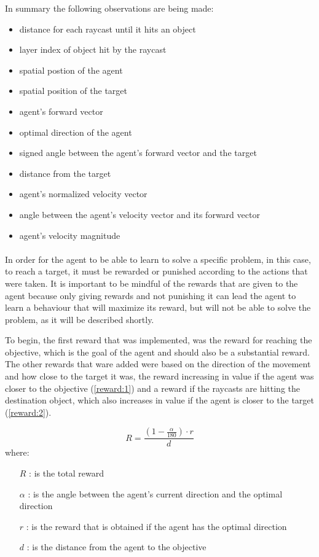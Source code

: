 In summary the following observations are being made:
\begin{itemize}
    \item distance for each raycast until it hits an object
    \item layer index of object hit by the raycast
    \item spatial postion of the agent
    \item spatial position of the target
    \item agent's forward vector
    \item optimal direction of the agent
    \item signed angle between the agent's forward vector and the target
    \item distance from the target
    \item agent's normalized velocity vector
    \item angle between the agent's velocity vector and its forward vector
    \item agent's velocity magnitude
\end{itemize}

\paragraph{}
In order for the agent to be able to learn to solve a specific problem, in this case, to reach a target, it must be rewarded or punished according to the actions that were taken. It is important to be mindful of the rewards that are given to the agent because only giving rewards and not punishing it can lead the agent to learn a behaviour that will maximize its reward, but will not be able to solve the problem, as it will be described shortly.

To begin, the first reward that was implemented, was the reward for reaching the objective, which is the goal of the agent and should also be a substantial reward. The other rewards that ware added were based on the direction of the movement and how close to the target it was, the reward increasing in value if the agent was closer to the objective (\ref{reward:1}) and a reward if the raycasts are hitting the destination object, which also increases in value if the agent is closer to the target (\ref{reward:2}). 

\begin{equation} \label{reward:1}
    R = \frac{(1 - \frac{\alpha}{180}) \cdot r}{d}
\end{equation}
where:
\begin{itemize}
    \item [$R$]: is the total reward
    \item [$\alpha$]: is the angle between the agent's current direction and the optimal direction
    \item [$r$]: is the reward that is obtained if the agent has the optimal direction
    \item [$d$]: is the distance from the agent to the objective
\end{itemize}

